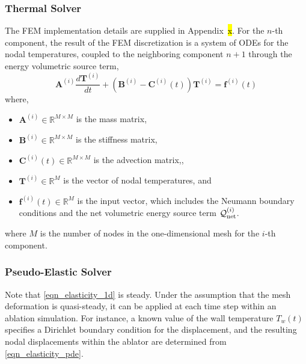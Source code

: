 \subsubsection{Thermal Solver}

The FEM implementation details are supplied in Appendix~\hl{x}. For the $n$-th component, the result of the FEM discretization is a system of ODEs for the nodal temperatures, coupled to the neighboring component $n+1$ through the energy volumetric source term,
\begin{equation}
    \mathbf{A}^{(i)}\frac{d\mathbf{T}^{(i)}}{dt} + \left(\mathbf{B}^{(i)} - \mathbf{C}^{(i)}(t)\right)\mathbf{T}^{(i)} = \mathbf{f}^{(i)}(t)
\end{equation}
where,
\begin{itemize}
    \item $\mathbf{A}^{(i)}\in\mathbb{R}^{M\times M}$ is the mass matrix,
    \item $\mathbf{B}^{(i)}\in\mathbb{R}^{M\times M}$ is the stiffness matrix,
    \item $\mathbf{C}^{(i)}(t)\in\mathbb{R}^{M\times M}$ is the advection matrix,,
    \item $\mathbf{T}^{(i)}\in\mathbb{R}^{M}$ is the vector of nodal temperatures, and
    \item $\mathbf{f}^{(i)}(t)\in\mathbb{R}^{M}$ is the input vector, which includes the Neumann boundary conditions and the net volumetric energy source term $\mathcal{Q}^{(i)}_{\text{net}}$.
\end{itemize}
where $M$ is the number of nodes in the one-dimensional mesh for the $i$-th component.

\subsubsection{Pseudo-Elastic Solver}

Note that \cref{eqn_elasticity_1d} is steady. Under the assumption that the mesh deformation is quasi-steady, it can be applied at each time step within an ablation simulation. For instance, a known value of the wall temperature $T_w(t)$ specifies a Dirichlet boundary condition for the displacement, and the resulting nodal displacements within the ablator are determined from \cref{eqn_elasticity_pde}.

